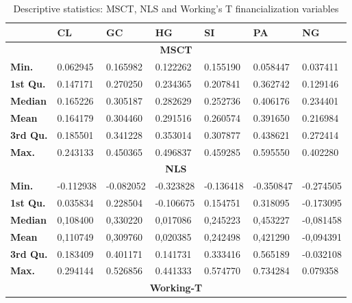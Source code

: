 \begin{landscape}
\begin{table}[]
\begin{center}
\caption{Descriptive statistics: MSCT, NLS and Working's T financialization variables}
\label{tab:stat5}
\begin{tabular}{@{}lllllll@{}}
\toprule
                 & \textbf{CL} & \textbf{GC} & \textbf{HG} & \textbf{SI} & \textbf{PA} & \textbf{NG} \\ \midrule
\multicolumn{7}{c}{\textbf{MSCT}}                                                                    \\ \midrule
\textbf{Min.}    & 0.062945    & 0.165982    & 0.122262    & 0.155190    & 0.058447    & 0.037411    \\
\textbf{1st Qu.} & 0.147171    & 0.270250    & 0.234365    & 0.207841    & 0.362742    & 0.129146    \\
\textbf{Median}  & 0.165226    & 0.305187    & 0.282629    & 0.252736    & 0.406176    & 0.234401    \\
\textbf{Mean}    & 0.164179    & 0.304460    & 0.291516    & 0.260574    & 0.391650    & 0.216984    \\
\textbf{3rd Qu.} & 0.185501    & 0.341228    & 0.353014    & 0.307877    & 0.438621    & 0.272414    \\
\textbf{Max.}    & 0.243133    & 0.450365    & 0.496837    & 0.459285    & 0.595550    & 0.402280    \\ \midrule
\multicolumn{7}{c}{\textbf{NLS}}                                                                     \\ \midrule
\textbf{Min.}    & -0.112938   & -0.082052   & -0.323828   & -0.136418   & -0.350847   & -0.274505   \\
\textbf{1st Qu.} & 0.035834    & 0.228504    & -0.106675   & 0.154751    & 0.318095    & -0.173095   \\
\textbf{Median}  & 0,108400    & 0,330220    & 0,017086    & 0,245223    & 0,453227    & -0,081458   \\
\textbf{Mean}    & 0,110749    & 0,309760    & 0,020385    & 0,242498    & 0,421290    & -0,094391   \\
\textbf{3rd Qu.} & 0.183409    & 0.401171    & 0.141731    & 0.333416    & 0.565189    & -0.032108   \\
\textbf{Max.}    & 0.294144    & 0.526856    & 0.441333    & 0.574770    & 0.734284    & 0.079358    \\ \midrule
\multicolumn{7}{c}{\textbf{Working-T}}                                                               \\ \midrule

\end{tabular}
\end{center}
\end{table}
\end{landscape}
